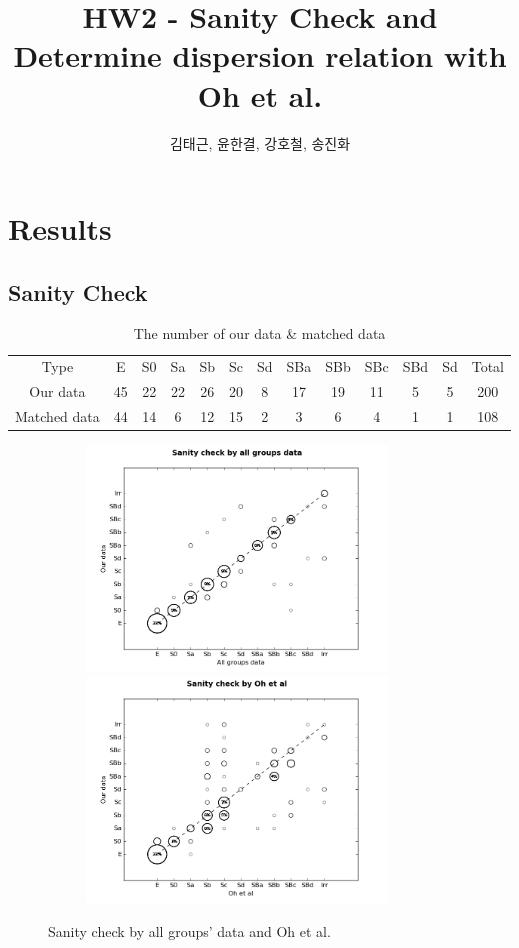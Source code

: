 \documentclass[a4paper,11pt]{article}
\title{\boldmath HW2 - Sanity Check and Determine dispersion relation with Oh et al.}
\author{김태근, 윤한결, 강호철, 송진화}
\affiliation{연세대학교 천문우주학과 F조}
\begin{document}
 
\maketitle
\flushbottom

\section{Results}
\label{sec:result}

\subsection{Sanity Check}
\label{subsec:sanity}

\begin{table}[h]
\centering
\begin{tabular}{|c||c|c|c|c|c|c|c|c|c|c|c||c|}
\hline
Type & E & S0 & Sa & Sb & Sc & Sd & SBa & SBb & SBc & SBd & Sd & Total\\
\hhline{|=||=|=|=|=|=|=|=|=|=|=|=||=|}
Our data & 45 & 22 & 22 & 26 & 20 & 8 & 17 & 19 & 11 & 5 & 5 & 200\\
\hline
Matched data & 44 & 14 & 6 & 12 & 15 & 2 & 3 & 6 & 4 & 1 & 1 & 108\\
\hline
\end{tabular}
\caption{\label{tab:i} The number of our data \& matched data }
\end{table}


\begin{figure}[h]
\centering
\includegraphics[height=60mm, width=100mm]{Sanity.png}
\hfill
\includegraphics[height=60mm, width=100mm]{Sanity_oh.png}
\caption{\label{fig:i} Sanity check by all groups' data and Oh et al.}
\end{figure}
\end{document}
